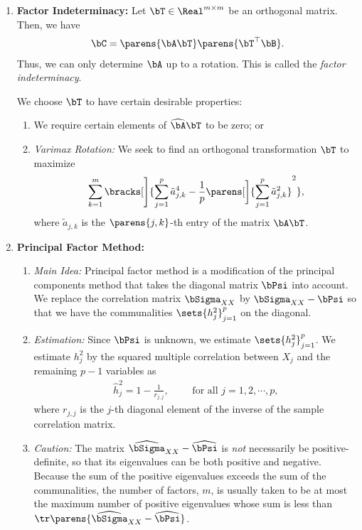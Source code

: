 \documentclass[12pt]{article}
\begin{document}
\begin{enumerate}[label=\textbf{\arabic*.}]
	\item \textbf{Factor Indeterminacy:} Let $\bT \in \Real^{m \times m}$ be an orthogonal matrix. Then, we have 
	\begin{align*}
		\bC = \parens{\bA \bT} \parens{\bT^\top \bB}. 
	\end{align*}
	Thus, we can only determine $\bA$ up to a rotation. This is called the \textit{factor indeterminacy}. 
	
	We choose $\bT$ to have certain desirable properties: 
	\begin{enumerate}
		\item We require certain elements of $\widehat{\bA} \bT$ to be zero; or 
		\item \textit{Varimax Rotation:} We seek to find an orthogonal transformation $\bT$ to maximize 
		\begin{align*}
			\sum_{k=1}^m \bracks[\Bigg]{\sum_{j=1}^p \tilde{a}_{j,k}^4 - \frac{1}{p} \parens[\bigg]{\sum_{j=1}^p \tilde{a}_{j,k}^2}^2}, 
		\end{align*}
		where $\tilde{a}_{j,k}$ is the $\parens{j,k}$-th entry of the matrix $\bA \bT$. 
	\end{enumerate}
	
	\item \textbf{Principal Factor Method:} 
	\begin{enumerate}
		\item \textit{Main Idea:} Principal factor method is a modification of the principal components method that takes the diagonal matrix $\bPsi$ into account. We replace the correlation matrix $\bSigma_{XX}$ by $\bSigma_{XX} - \bPsi$ so that we have the communalities $\sets{h_j^2}_{j=1}^p$ on the diagonal. 
		\item \textit{Estimation:} Since $\bPsi$ is unknown, we estimate $\sets{h_j^2}_{j=1}^p$. We estimate $h_j^2$ by the squared multiple correlation between $X_j$ and the remaining $p-1$ variables as 
		\begin{align}
			\hat{h}_j^2 = 1 - \frac{1}{r_{j,j}}, \qquad \text{ for all } j = 1, 2, \cdots, p, 
		\end{align}
		where $r_{j,j}$ is the $j$-th diagonal element of the inverse of the sample correlation matrix. 
		
		\item \textit{Caution:} The matrix $\widehat{\bSigma}_{XX} - \widehat{\bPsi}$ is \emph{not} necessarily be positive-definite, so that its eigenvalues can be both positive and negative. Because the sum of the positive eigenvalues exceeds the sum of the communalities, the number of factors, $m$, is usually taken to be at most the maximum number of positive eigenvalues whose sum is less than $\tr \parens{\widehat{\bSigma}_{XX} - \widehat{\bPsi}}$. 
	\end{enumerate}
	

\end{enumerate}
\end{document}
